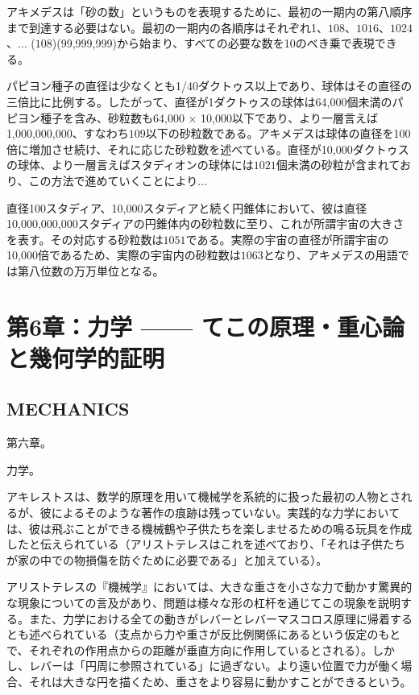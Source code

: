 \documentclass[a4paper,11pt,openany]{ltjsbook}
\begin{document}
アキメデスは「砂の数」というものを表現するために、最初の一期内の第八順序まで到達する必要はない。最初の一期内の各順序はそれぞれ1、$10{8}$、$10{16}$、$10{24}$、... ($10{8}$)(99,999,999)から始まり、すべての必要な数を10のべき乗で表現できる。

パピヨン種子の直径は少なくとも1/40ダクトゥス以上であり、球体はその直径の三倍比に比例する。したがって、直径が1ダクトゥスの球体は64,000個未満のパピヨン種子を含み、砂粒数も64,000 × 10,000以下であり、より一層言えば1,000,000,000、すなわち$10{9}$以下の砂粒数である。アキメデスは球体の直径を100倍に増加させ続け、それに応じた砂粒数を述べている。直径が10,000ダクトゥスの球体、より一層言えばスタディオンの球体には$10{21}$個未満の砂粒が含まれており、この方法で進めていくことにより...

直径100スタディア、10,000スタディアと続く円錐体において、彼は直径10,000,000,000スタディアの円錐体内の砂粒数に至り、これが所謂宇宙の大きさを表す。その対応する砂粒数は$10{51}$である。実際の宇宙の直径が所謂宇宙の10,000倍であるため、実際の宇宙内の砂粒数は$10{63}$となり、アキメデスの用語では第八位数の万万単位となる。

\clearpage

\chapter{第6章：力学 —— てこの原理・重心論と幾何学的証明}
\section*{MECHANICS}

第六章。

力学。

アキレストスは、数学的原理を用いて機械学を系統的に扱った最初の人物とされるが、彼によるそのような著作の痕跡は残っていない。実践的な力学においては、彼は飛ぶことができる機械鶴や子供たちを楽しませるための鳴る玩具を作成したと伝えられている（アリストテレスはこれを述べており、「それは子供たちが家の中での物損傷を防ぐために必要である」と加えている）。

アリストテレスの『機械学』においては、大きな重さを小さな力で動かす驚異的な現象についての言及があり、問題は様々な形の杠杆を通じてこの現象を説明する。また、力学における全ての動きがレバーとレバーマスコロス原理に帰着するとも述べられている（支点から力や重さが反比例関係にあるという仮定のもとで、それぞれの作用点からの距離が垂直方向に作用しているとされる）。しかし、レバーは「円周に参照されている」に過ぎない。より遠い位置で力が働く場合、それは大きな円を描くため、重さをより容易に動かすことができるという。
\end{document}
